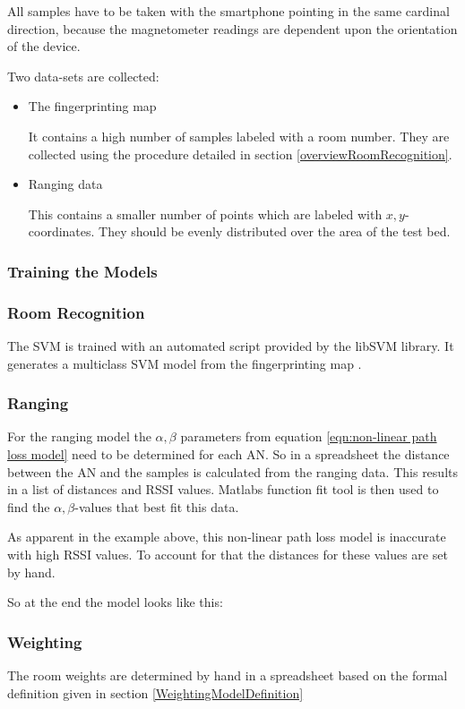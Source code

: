 All samples have to be taken with the smartphone pointing in the same cardinal direction, because the magnetometer readings are dependent upon the orientation of the device.


Two data-sets are collected:

\begin{itemize}
\item The fingerprinting map

It contains a high number of samples labeled with a room number. They are collected using the procedure detailed in section \ref{overviewRoomRecognition}.

\item Ranging data

This contains a smaller number of points which are labeled with \(x,y\)-coordinates. They should be evenly distributed over the area of the test bed.
\end{itemize}

\subsubsection{Training the Models}

\subsubsection{Room Recognition}
The SVM is trained with an automated script provided by the libSVM library. It generates a multiclass SVM model from the fingerprinting map .

\subsubsection{Ranging}
For the ranging model the \(\alpha, \beta\) parameters from equation \ref{eqn:non-linear path loss model} need to be determined for each AN. So in a spreadsheet the distance between the AN and the samples is calculated from the ranging data. This results in a list of distances and RSSI values. Matlabs function fit tool is then used to find the \(\alpha, \beta\)-values that best fit this data.

As apparent in the example above, this non-linear path loss model is inaccurate with high RSSI values. To account for that the distances for these values are set by hand.

So at the end the model looks like this:


\subsubsection{Weighting}

The room weights are determined by hand in a spreadsheet based on the formal definition given in section \ref{WeightingModelDefinition}
